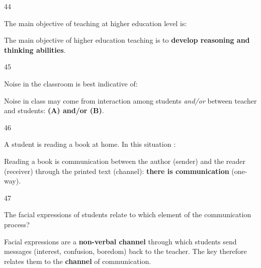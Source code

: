 \begin{question}{44}
{The main objective of teaching at higher education level is:\par}
\begin{explain}
The main objective of higher education teaching is to \textbf{develop reasoning and thinking abilities}.
\end{explain}
\end{question}

\begin{question}{45}
{Noise in the classroom is best indicative of:\par}
\begin{explain}
Noise in class may come from interaction among students \emph{and/or} between teacher and students: \textbf{(A) and/or (B)}.
\end{explain}
\end{question}

\begin{question}{46}
{A student is reading a book at home. In this situation :\par}
\begin{explain}
Reading a book is communication between the author (sender) and the reader (receiver) through the printed text (channel): \textbf{there is communication} (one-way).
\end{explain}
\end{question}

\begin{question}{47}
{The facial expressions of students relate to which element of the communication process?\par}
\begin{explain}
Facial expressions are a \textbf{non-verbal channel} through which students send messages (interest, confusion, boredom) back to the teacher. The key therefore relates them to the \textbf{channel} of communication.
\end{explain}
\end{question}


